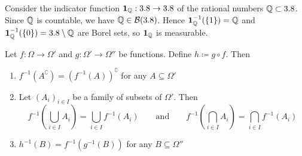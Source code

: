 \begin{example}
Consider the indicator function $\mathbf{1}_{\mathbb{Q}} : 3.8 \to 3.8$ of the rational numbers $\mathbb{Q} \subset 3.8$.
Since $\mathbb{Q}$ is countable, we have $\mathbb{Q} \in \mathcal{B}(3.8)$.
Hence $\mathbf{1}_{\mathbb{Q}}^{-1}(\{1\}) = \mathbb{Q}$ and $\mathbf{1}_{\mathbb{Q}}^{-1}(\{0\}) = 3.8 \setminus \mathbb{Q}$ are Borel sets, so $\mathbf{1}_{\mathbb{Q}}$ is measurable.
\end{example}




\begin{fact}\label{fact:preimage-properties} %
Let 
$f : \Omega \to \Omega'$ and $g : \Omega' \to \Omega''$ be functions.
Define $h \coloneq g \circ f$.
Then
\begin{enumerate}[label=(\roman*)]
\item  %
\label{item:preimage-properties-complement}
$f^{-1}(A^{\complement}) = (f^{-1}(A))^{\complement}$ for any $A \subseteq \Omega'$
\item  %
\label{item:preimage-properties-union-intersection}
Let $(A_i)_{i \in I}$ be a family of subsets of $\Omega'$. Then
\[
f^{-1}\left(\bigcup_{i \in I} A_i\right) = \bigcup_{i \in I} f^{-1}(A_i)
\qquad
\text{and}
\qquad
f^{-1}\left(\bigcap_{i \in I} A_i\right) = \bigcap_{i \in I} f^{-1}(A_i)
\]
\item %
\label{item:preimage-properties-composition}
$h^{-1}(B) = f^{-1}(g^{-1}(B))$ for any $B \subseteq \Omega''$
\qedhere
\end{enumerate}
\end{fact}

